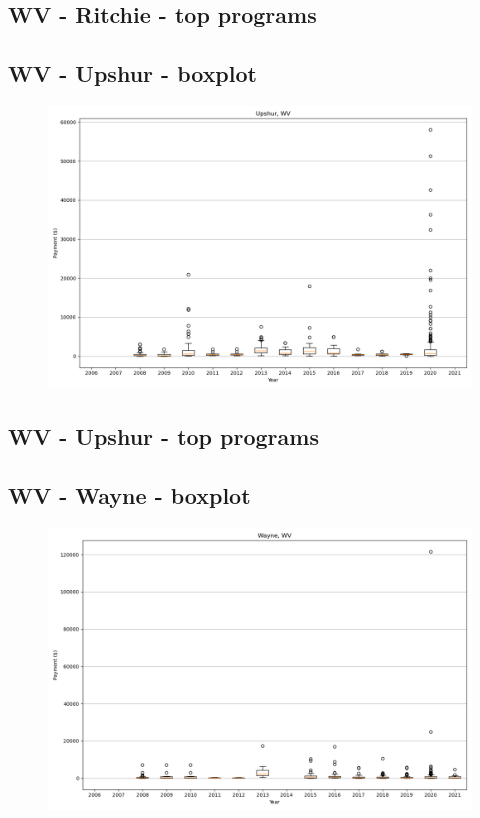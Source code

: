 \subsection*{WV - Ritchie - top programs}

\newpage
\subsection*{WV - Upshur - boxplot}
\begin{figure}[h]
\centering
\includegraphics[width=7in]{../output/boxplots/counties/Upshur-WV_boxplot.png}
\end{figure}


\subsection*{WV - Upshur - top programs}

\newpage
\subsection*{WV - Wayne - boxplot}
\begin{figure}[h]
\centering
\includegraphics[width=7in]{../output/boxplots/counties/Wayne-WV_boxplot.png}
\end{figure}


